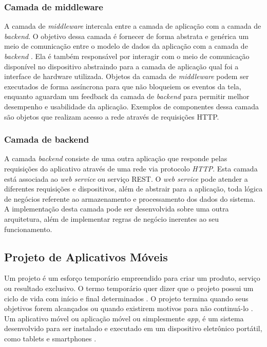 \subsubsection{Camada de middleware}
A camada de \textit{middleware} intercala entre a camada de aplicação com a camada de \textit{backend}. O objetivo dessa camada é fornecer de forma abstrata e genérica um meio de comunicação entre o modelo de dados da aplicação com a camada de \textit{backend} \cite{Pabllo:2008:MMA:1621087.1621128}. Ela é também responsável por interagir com o meio de comunicação disponível no dispositivo abstraindo para a camada de aplicação qual foi a interface de hardware utilizada. Objetos da camada de \textit{middleware} podem ser executados de forma assíncrona para que não bloqueiem os eventos da tela, enquanto aguardam um feedback da camada de \textit{backend} para permitir melhor desempenho e usabilidade da aplicação. Exemplos de componentes dessa camada são objetos que realizam acesso a rede através de requisições HTTP.

\subsubsection{Camada de backend}
A camada \textit{backend} consiste de uma outra aplicação que responde pelas requisições do aplicativo através de uma rede via protocolo \textit{HTTP}. Esta camada está associada ao \textit{web service} ou serviço REST. O \textit{web service} pode atender a diferentes requisições e dispositivos, além de abstrair para a aplicação, toda lógica de negócios referente ao armazenamento e processamento dos dados do sistema. A implementação desta camada pode ser desenvolvida sobre uma outra arquitetura, além de implementar regras de negócio inerentes ao seu funcionamento.




\subsection{Projeto de Aplicativos Móveis}
Um projeto é um esforço temporário empreendido para criar um produto, serviço ou resultado exclusivo. O termo temporário quer dizer que o projeto possui um ciclo de vida com início e final determinados \cite{governanadetidotcom}. O projeto termina quando seus objetivos forem alcançados ou quando existirem motivos para não continuá-lo \cite{governanadetidotcom}. Um aplicativo móvel ou aplicação móvel ou simplesmente \textit{app}, é um sistema desenvolvido para ser instalado e executado em um dispositivo eletrônico portátil, como tablets e smartphones \cite{what_is_mobile}.\par

